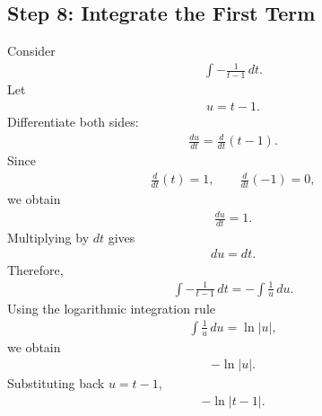 \documentclass[letterpaper,10pt,english]{sphinxmanual}
\begin{document}
\subsection{Step 8: Integrate the First Term}
\label{\detokenize{Language/Science_language/ODE_calculus/course_MATH_3035/homework_assignments/index_pdf:step-8-integrate-the-first-term}}
\sphinxAtStartPar
Consider
\begin{equation*}
\begin{split}\int -\frac{1}{t-1}\,dt.\end{split}
\end{equation*}
\sphinxAtStartPar
Let
\begin{equation*}
\begin{split}u=t-1.\end{split}
\end{equation*}
\sphinxAtStartPar
Differentiate both sides:
\begin{equation*}
\begin{split}\frac{du}{dt}
=
\frac{d}{dt}(t-1).\end{split}
\end{equation*}
\sphinxAtStartPar
Since
\begin{equation*}
\begin{split}\frac{d}{dt}(t)=1,
\qquad
\frac{d}{dt}(-1)=0,\end{split}
\end{equation*}
\sphinxAtStartPar
we obtain
\begin{equation*}
\begin{split}\frac{du}{dt}=1.\end{split}
\end{equation*}
\sphinxAtStartPar
Multiplying by \(dt\) gives
\begin{equation*}
\begin{split}du=dt.\end{split}
\end{equation*}
\sphinxAtStartPar
Therefore,
\begin{equation*}
\begin{split}\int -\frac{1}{t-1}\,dt
=
-\int \frac{1}{u}\,du.\end{split}
\end{equation*}
\sphinxAtStartPar
Using the logarithmic integration rule
\begin{equation*}
\begin{split}\int \frac{1}{u}\,du=\ln|u|,\end{split}
\end{equation*}
\sphinxAtStartPar
we obtain
\begin{equation*}
\begin{split}-\ln|u|.\end{split}
\end{equation*}
\sphinxAtStartPar
Substituting back \(u=t-1\),
\begin{equation*}
\begin{split}-\ln|t-1|.\end{split}
\end{equation*}
\end{document}
